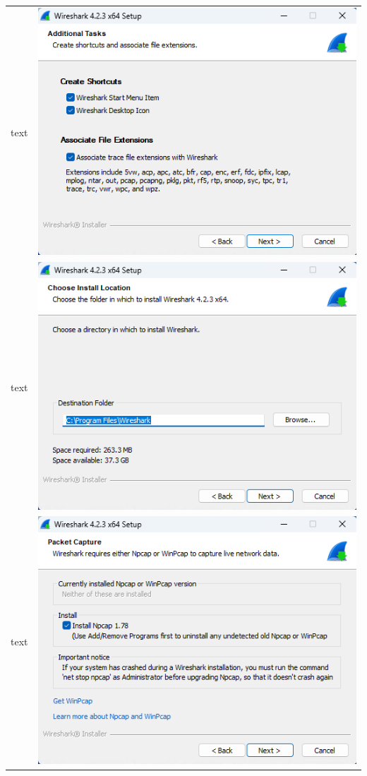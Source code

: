 \documentclass[11pt]{report}
\begin{document}
\begin{tabular}{ l r }
            text & \includegraphics[scale=1.0]{wireshark06} \\
            text & \includegraphics[scale=1.0]{wireshark07} \\
            text & \includegraphics[scale=1.0]{wireshark08} \\

\end{tabular}
\end{document}
